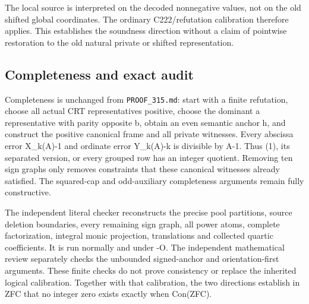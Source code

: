 The local source is interpreted on the decoded nonnegative values, not on the old shifted global coordinates. The ordinary C222/\allowbreak{}refutation calibration therefore applies. This establishes the soundness direction without a claim of pointwise restoration to the old natural private or shifted representation.



\subsection{Completeness and exact audit}



Completeness is unchanged from \texttt{PROOF\_\allowbreak{}315.md}: start with a finite refutation, choose all actual CRT representatives positive, choose the dominant a representative with parity opposite b, obtain an even semantic anchor h, and construct the positive canonical frame and all private witnesses. Every abscissa error X\_\allowbreak{}k(A)-1 and ordinate error Y\_\allowbreak{}k(A)-k is divisible by A-1. Thus (1), its separated version, or every grouped row has an integer quotient. Removing ten sign graphs only removes constraints that these canonical witnesses already satisfied. The squared-cap and odd-auxiliary completeness arguments remain fully constructive.



The independent literal checker reconstructs the precise pool partitions, source deletion boundaries, every remaining sign graph, all power atoms, complete factorization, integral monic projection, translations and collected quartic coefficients. It is run normally and under -O. The independent mathematical review separately checks the unbounded signed-anchor and orientation-first arguments. These finite checks do not prove consistency or replace the inherited logical calibration. Together with that calibration, the two directions establish in ZFC that no integer zero exists exactly when Con(ZFC).
